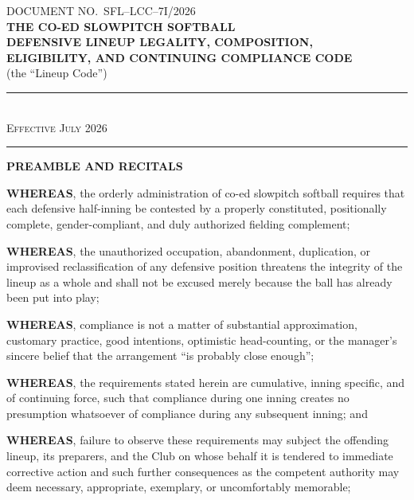 \documentclass[11pt]{article}
\begin{document}
\thispagestyle{empty}
\begin{center}
{\small DOCUMENT NO.\ SFL--LCC--7I/2026}\\[0.35in]

{\Large\bfseries THE CO-ED SLOWPITCH SOFTBALL}\\[4pt]
{\Large\bfseries DEFENSIVE LINEUP LEGALITY, COMPOSITION,}\\[4pt]
{\Large\bfseries ELIGIBILITY, AND CONTINUING COMPLIANCE CODE}\\[0.18in]

{\large (the ``Lineup Code'')}\\[0.35in]

\rule{0.72\textwidth}{0.6pt}\\[0.16in]
{\small\textsc{Effective July 2026}}\\[0.16in]
\rule{0.72\textwidth}{0.6pt}
\end{center}

\vspace{0.35in}

\textbf{PREAMBLE AND RECITALS}

\textbf{WHEREAS}, the orderly administration of co-ed slowpitch softball
requires that each defensive half-inning be contested by a properly
constituted, positionally complete, gender-compliant, and duly authorized
fielding complement;

\textbf{WHEREAS}, the unauthorized occupation, abandonment, duplication, or
improvised reclassification of any defensive position threatens the integrity
of the lineup as a whole and shall not be excused merely because the ball has
already been put into play;

\textbf{WHEREAS}, compliance is not a matter of substantial approximation,
customary practice, good intentions, optimistic head-counting, or the
manager's sincere belief that the arrangement ``is probably close enough'';

\textbf{WHEREAS}, the requirements stated herein are cumulative, inning
specific, and of continuing force, such that compliance during one inning
creates no presumption whatsoever of compliance during any subsequent inning;
and

\textbf{WHEREAS}, failure to observe these requirements may subject the
offending lineup, its preparers, and the Club on whose behalf it is tendered
to immediate corrective action and such further consequences as the
competent authority may deem necessary, appropriate, exemplary, or
uncomfortably memorable;
\end{document}
